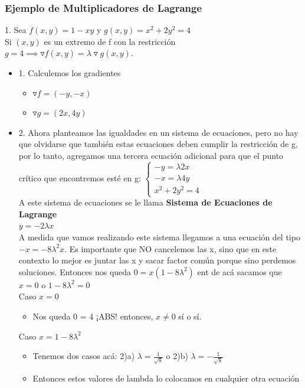 \documentclass[10pt,a4paper]{article}
\begin{document}
\subsubsection*{Ejemplo de Multiplicadores de Lagrange}
1. Sea $f(x,y) = 1-xy$ y $g(x,y) = x^{2} + 2y^{2} = 4$ \\
Si $(x,y)$ es un extremo de f con la restricción $g = 4 \implies \triangledown f(x,y) = \lambda \triangledown g(x,y)$. 
\begin{itemize}
    \item 1. Calculemos los gradientes
    \begin{itemize}
        \item  $\triangledown f = (-y, -x)$
        \item $\triangledown g = (2x, 4y)$
    \end{itemize}
    \item 2. Ahora planteamos las igualdades en un sistema de ecuaciones, pero no hay que olvidarse que también estas ecuaciones deben cumplir la restricción de g, por lo tanto, agregamos una tercera ecuación adicional para que el punto crítico que encontremos esté en g: 
        $\begin{cases} 
            -y = \lambda 2x \\
            -x = \lambda 4 y \\
            x^{2} + 2y^{2} = 4
        \end{cases}$ \\
    A este sistema de ecuaciones se le llama \textbf{Sistema de Ecuaciones de Lagrange} \\
    $y = -2 \lambda x$ \\
    A medida que vamos realizando este sistema llegamos a una ecuación del tipo $-x = -8 \lambda^{2} x$. Es importante que NO cancelemos las x, sino que en este contexto lo mejor es juntar las x y sacar factor común porque sino perdemos soluciones. Entonces nos queda $0 = x(1-8\lambda^{2})$ ent de acá sacamos que $x = 0$ o $1-8\lambda^{2} = 0$ \\
    Caso $x = 0$
        \begin{itemize}
            \item Nos queda 0 = 4 ¡ABS! entonces, $x \neq 0$ sí o sí.
        \end{itemize}
    Caso $x = 1-8\lambda^{2}$
        \begin{itemize}
            \item Tenemos dos casos acá: 2)a) $ \lambda = \frac{1}{\sqrt{8}}$ o 2)b) $\lambda = -\frac{1}{\sqrt{8}}$
            \item Entonces estos valores de lambda lo colocamos en cualquier otra ecuación

\end{itemize}
\end{itemize}
\end{document}
